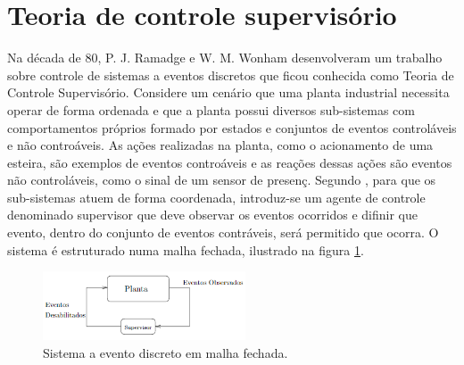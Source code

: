 \section{Teoria de controle supervis\'orio}
Na d\'ecada de 80, P. J. Ramadge e W. M. Wonham desenvolveram um trabalho sobre controle de sistemas a eventos discretos que ficou conhecida como Teoria de Controle Supervis\'orio. Considere um cen\'ario que uma planta industrial necessita operar de forma ordenada e que a planta possui diversos sub-sistemas com comportamentos pr\'oprios formado por estados e conjuntos de eventos control\'aveis e n\~ao contro\'aveis. As a\c{c}\~oes realizadas na planta, como o acionamento de uma esteira, s\~ao exemplos de eventos contro\'aveis e as rea\c{c}\~oes dessas a\c{c}\~oes s\~ao eventos n\~ao control\'aveis, como o sinal de um sensor de presen\c{c}\a. Segundo \cite{apostilacury}, para que os sub-sistemas atuem de forma coordenada, introduz-se um agente de controle denominado supervisor que deve observar os eventos ocorridos e difinir que evento, dentro do conjunto de eventos contr\'aveis, ser\'a permitido que ocorra. O sistema \'e estruturado numa malha fechada, ilustrado na figura \ref{fig:tcsmalhafechada}.

\begin{figure}[!htb]
	\caption[Sistema a evento discreto em malha fechada]{Sistema a evento discreto em malha fechada.}
	\label{fig:tcsmalhafechada}
	\includegraphics[width=6cm]{./figuras/TCS_EM_MALHA_FECHADA.png}\centering
\end{figure}



